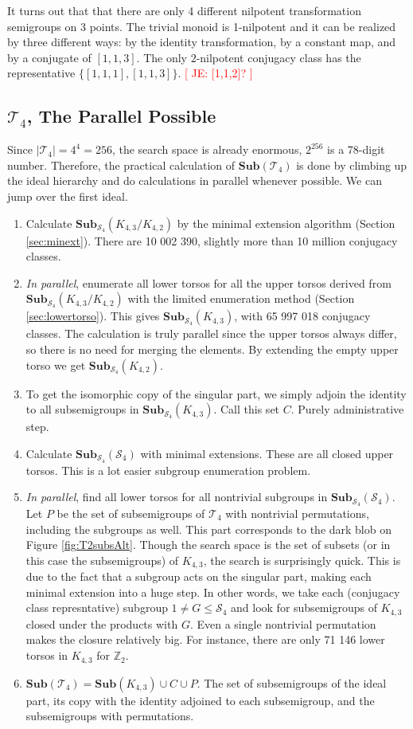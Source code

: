 \documentclass{amsart}
\newcommand{\cT}{{\mathcal T}}
\newcommand{\cS}{{\mathcal S}}
\newcommand{\Sub}{\mathbf{Sub}}
\newcommand{\todo}[1]{\textcolor{red}{ \small \textsf{[ #1 ]} \normalsize}}
\theoremstyle{plain}
\theoremstyle{definition}
\begin{document}
It turns out that that there are only 4 different nilpotent transformation semigroups on 3 points.
The trivial monoid is 1-nilpotent and it can be realized by three different ways: by the identity transformation, by a constant map, and by a conjugate of $[1,1,3]$.
The only $2$-nilpotent conjugacy class has the representative $\{[1,1,1],[1,1,3]\}$. \todo{JE: [1,1,2]?}

\subsection{$\cT_4$, The Parallel Possible }
Since $|\cT_4|=4^4=256$, the search space is already enormous, $2^{256}$ is a 78-digit number.
Therefore, the practical calculation of  $\Sub(\cT_4)$ is done by climbing up the ideal hierarchy and do calculations in parallel whenever possible.
We can jump over the first ideal.

\begin{enumerate}
\item Calculate $\Sub_{\cS_4}(K_{4,3}/K_{4,2})$ by the minimal extension algorithm (Section \ref{sec:minext}). There are 10 002 390, slightly more than 10 million conjugacy classes.  
\item \emph{In parallel}, enumerate all lower torsos for all the upper torsos derived from  $\Sub_{\cS_4}(K_{4,3}/K_{4,2})$ with the limited enumeration method (Section \ref{sec:lowertorso}). This gives $\Sub_{\cS_4}(K_{4,3})$, with  65 997 018 conjugacy classes. The calculation is truly parallel since the upper torsos always differ, so there is no need for merging the elements. By extending the empty upper torso we get $\Sub_{\cS_4}(K_{4,2})$.
\item To get the isomorphic copy of the singular part, we simply adjoin the identity to all subsemigroups in $\Sub_{\cS_4}(K_{4,3})$. Call this set $C$.
Purely administrative step.
\item Calculate $\Sub_{\cS_4}(\cS_4)$ with minimal extensions. These are all closed upper torsos. This is a lot easier subgroup enumeration problem.
\item \emph{In parallel}, find all lower torsos for all nontrivial subgroups in $\Sub_{\cS_4}(\cS_4)$. Let $P$ be the set of subsemigroups of $\cT_4$ with nontrivial permutations, including the subgroups as well. This part corresponds to the dark blob on Figure \ref{fig:T2subsAlt}.
Though the search space is the set of subsets (or in this case the subsemigroups) of $K_{4,3}$, the search is surprisingly quick.
This is due to the fact that a subgroup acts on the singular part, making each minimal extension into a huge step.
In other words, we take each (conjugacy class represntative) subgroup $1\neq G\leq \cS_4$ and look for subsemigroups of $K_{4,3}$ closed under the products with $G$.
Even a single nontrivial permutation makes the closure relatively big.
For instance, there are only 71 146 lower torsos in $K_{4,3}$ for $\mathbb{Z}_2$.
\item $\Sub(\cT_4)=\Sub(K_{4,3})\cup C \cup P$. The set of subsemigroups of the ideal part, its copy with the identity adjoined to each subsemigroup, and the subsemigroups with permutations.
\end{enumerate}
\end{document}

